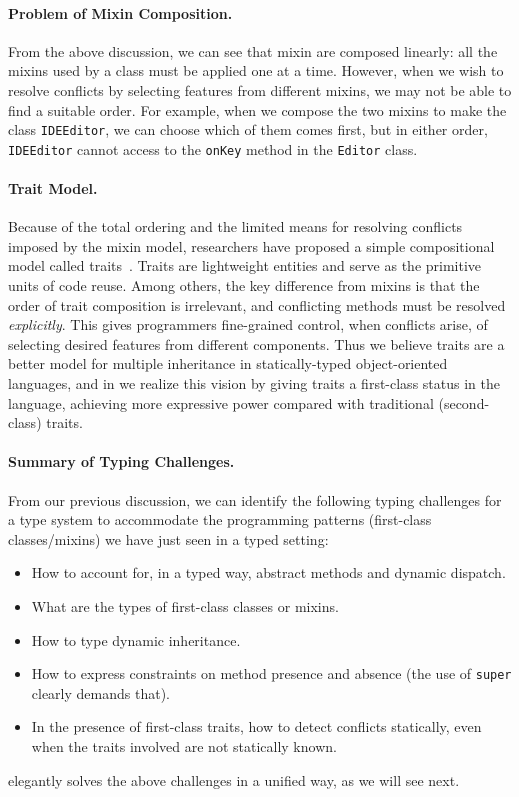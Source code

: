 \paragraph{Problem of Mixin Composition.}
From the above discussion, we can see that mixin are composed linearly: all the
mixins used by a class must be applied one at a time. However, when we wish to
resolve conflicts by selecting features from different mixins, we may not be
able to find a suitable order. For example, when we compose the two mixins to
make the class \lstinline{IDEEditor}, we can choose which of them comes first,
but in either order, \lstinline{IDEEditor} cannot access to the \lstinline{onKey}
method in the \lstinline{Editor} class.

\paragraph{Trait Model.}
Because of the total ordering and the limited means for resolving conflicts imposed by the mixin model,
researchers have proposed a simple compositional model called
traits~\cite{scharli2003traits, Ducasse_2006}. Traits are lightweight entities and serve as
the primitive units of code reuse. Among others, the key difference from
mixins is that the order of trait composition is irrelevant, and conflicting
methods must be resolved \emph{explicitly}. This gives programmers
fine-grained control, when conflicts arise, of selecting desired features from
different components. Thus we believe traits are a better model for multiple
inheritance in statically-typed object-oriented languages, and in \sedel we realize this
vision by giving traits a first-class status in the language,
achieving more expressive power compared with traditional (second-class) traits.


\paragraph{Summary of Typing Challenges.}
From our previous discussion, we can identify the following typing challenges
for a type system to accommodate the programming patterns (first-class classes/mixins)
we have just seen in a typed setting:
\begin{itemize}
\item How to account for, in a typed way, abstract methods and dynamic dispatch.
\item What are the types of first-class classes or mixins.
\item How to type dynamic inheritance.
\item How to express constraints on method presence and absence (the use of
  \lstinline{super} clearly demands that).
\item In the presence of first-class traits, how to detect conflicts statically,
  even when the traits involved are not statically known.
\end{itemize}
\sedel elegantly solves the above challenges in a unified way, as
we will see next.


